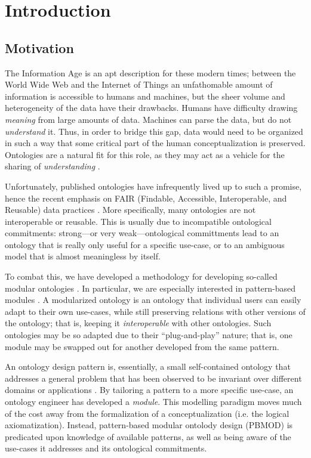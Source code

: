 \chapter{Introduction}

\section*{Motivation}
The Information Age is an apt description for these modern times; between the World Wide Web and the Internet of Things an unfathomable amount of information is accessible to humans and machines, but the sheer volume and heterogeneity of the data have their drawbacks. Humans have difficulty drawing \emph{meaning} from large amounts of data. Machines can parse the data, but do not \emph{understand} it. Thus, in order to bridge this gap, data would need to be organized in such a way that some critical part of the human conceptualization is preserved. Ontologies are a natural fit for this role, as they may act as a vehicle for the sharing of \emph{understanding} \cite{gruber}.

Unfortunately, published ontologies have infrequently lived up to such a promise, hence the recent emphasis on FAIR (Findable, Accessible, Interoperable, and Reusable) data practices \cite{fair}. More specifically, many ontologies are not interoperable or reusable. This is usually due to incompatible ontological commitments: strong---or very weak---ontological committments lead to an ontology that is really only useful for a specific use-case, or to an ambiguous model that is almost meaningless by itself.

To combat this, we have developed a methodology for developing so-called modular ontologies \cite{chess}. In particular, we are especially interested in pattern-based modules \cite{momtut}. A modularized ontology is an ontology that individual users can easily adapt to their own use-cases, while still preserving relations with other versions of the ontology; that is, keeping it \emph{interoperable} with other ontologies. Such ontologies may be so adapted due to their ``plug-and-play'' nature; that is, one module may be swapped out for another developed from the same pattern.

An ontology design pattern is, essentially, a small self-contained ontology that addresses a general problem that has been observed to be invariant over different domains or applications \cite{odpbook}. By tailoring a pattern to a more specific use-case, an ontology engineer has developed a \emph{module}. This modelling paradigm moves much of the cost away from the formalization of a conceptualization (i.e. the logical axiomatization). Instead, pattern-based modular ontolody design (PBMOD) is predicated upon knowledge of available patterns, as well as being aware of the use-cases it addresses and its ontological commitments. 


